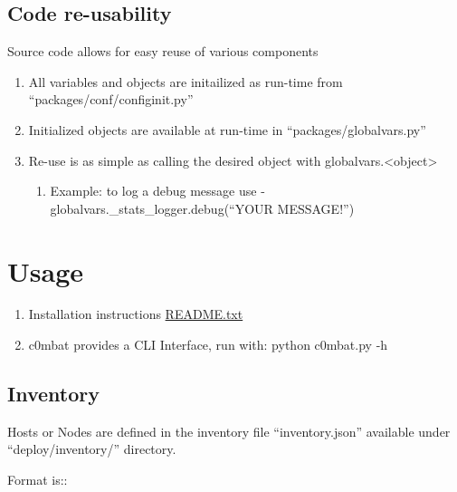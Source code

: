 \documentclass[letterpaper,10pt,english]{sphinxmanual}
\begin{document}
\subsection{Code re-usability}
\label{Introduction:code-re-usability}
Source code allows for easy reuse of various components
\begin{enumerate}
\item {} 
All variables and objects are initailized as run-time from ``packages/conf/configinit.py''

\item {} 
Initialized objects are available at run-time in ``packages/globalvars.py''

\item {} 
Re-use is as simple as calling the desired object with globalvars.\textless{}object\textgreater{}
\begin{enumerate}
\item {} 
Example: to log a debug message use - globalvars.\_stats\_logger.debug(``YOUR MESSAGE!'')

\end{enumerate}

\end{enumerate}


\section{Usage}
\label{Introduction:usage}\begin{enumerate}
\item {} 
Installation instructions \href{https://github.com/weqaar/c0mbat/blob/master/README.txt}{README.txt}

\item {} 
c0mbat provides a CLI Interface, run with: python c0mbat.py -h

\end{enumerate}


\subsection{Inventory}
\label{Introduction:inventory}
Hosts or Nodes are defined in the inventory file ``inventory.json'' available under ``deploy/inventory/'' directory.

Format is::
\end{document}
